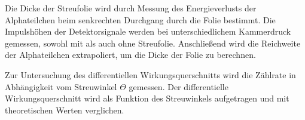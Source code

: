 Die Dicke der Streufolie wird durch Messung des Energieverlusts der Alphateilchen beim senkrechten Durchgang durch die Folie bestimmt. Die Impulshöhen der Detektorsignale werden bei unterschiedlichem Kammerdruck gemessen, sowohl mit als auch ohne Streufolie. Anschließend wird die Reichweite der Alphateilchen extrapoliert, um die Dicke der Folie zu berechnen.

Zur Untersuchung des differentiellen Wirkungsquerschnitts wird die Zählrate in Abhängigkeit vom Streuwinkel $\Theta$ gemessen. Der differentielle Wirkungsquerschnitt wird als Funktion des Streuwinkels aufgetragen und mit theoretischen Werten verglichen. 

